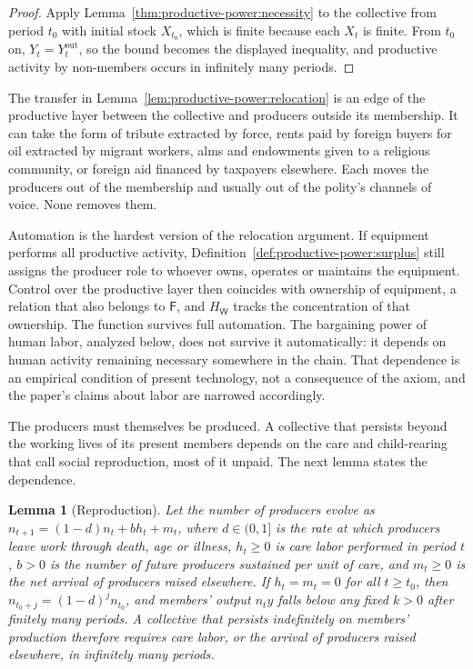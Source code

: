 \documentclass[11pt,letterpaper]{article}
\newtheorem{lemma}[theorem]{Lemma}
\theoremstyle{definition}
\theoremstyle{remark}
\newcommand{\pF}{\mathsf{F}}
\newcommand{\pW}{\mathsf{W}}
\newcommand{\HW}{H_{\pW}}
\begin{document}
\begin{proof}
Apply Lemma~\ref{thm:productive-power:necessity} to the collective from period $t_0$ with initial stock $X_{t_0}$, which is finite because each $X_t$ is finite. From $t_0$ on, $Y_t=Y^{\mathrm{out}}_t$, so the bound becomes the displayed inequality, and productive activity by non-members occurs in infinitely many periods.
\end{proof}

The transfer in Lemma~\ref{lem:productive-power:relocation} is an edge of the productive layer between the collective and producers outside its membership. It can take the form of tribute extracted by force, rents paid by foreign buyers for oil extracted by migrant workers, alms and endowments given to a religious community, or foreign aid financed by taxpayers elsewhere. Each moves the producers out of the membership and usually out of the polity's channels of voice. None removes them.

Automation is the hardest version of the relocation argument. If equipment performs all productive activity, Definition~\ref{def:productive-power:surplus} still assigns the producer role to whoever owns, operates or maintains the equipment. Control over the productive layer then coincides with ownership of equipment, a relation that also belongs to $\pF$, and $\HW$ tracks the concentration of that ownership. The function survives full automation. The bargaining power of human labor, analyzed below, does not survive it automatically: it depends on human activity remaining necessary somewhere in the chain. That dependence is an empirical condition of present technology, not a consequence of the axiom, and the paper's claims about labor are narrowed accordingly.

The producers must themselves be produced. A collective that persists beyond the working lives of its present members depends on the care and child-rearing that \citet{laslett1989} call social reproduction, most of it unpaid. The next lemma states the dependence.

\begin{lemma}[Reproduction]
\label{lem:productive-power:reproduction}
Let the number of producers evolve as $n_{t+1}=(1-d)n_t+bh_t+m_t$, where $d\in(0,1]$ is the rate at which producers leave work through death, age or illness, $h_t\ge 0$ is care labor performed in period $t$, $b>0$ is the number of future producers sustained per unit of care, and $m_t\ge 0$ is the net arrival of producers raised elsewhere. If $h_t=m_t=0$ for all $t\ge t_0$, then $n_{t_0+j}=(1-d)^jn_{t_0}$, and members' output $n_ty$ falls below any fixed $k>0$ after finitely many periods. A collective that persists indefinitely on members' production therefore requires care labor, or the arrival of producers raised elsewhere, in infinitely many periods.
\end{lemma}
\end{document}
